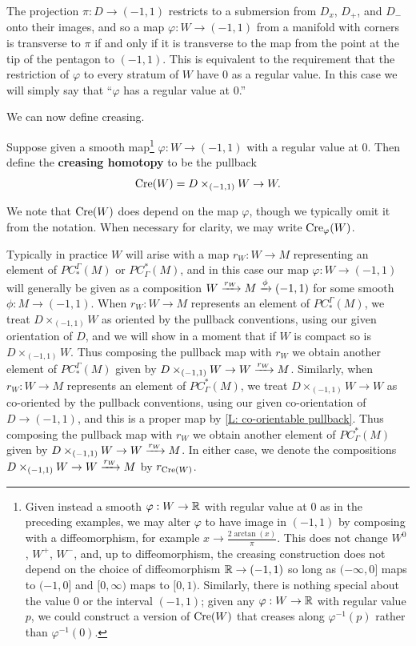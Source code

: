 The projection $\pi:D\to (-1,1)$ restricts to a submersion from $D_x$, $D_+$, and $D_-$ onto their images, and so a map $\varphi: W\to (-1,1)$ from a manifold with corners is transverse to $\pi$ if and only if it is transverse to the map from the point at the tip of the pentagon to $(-1,1)$. This is equivalent to the requirement that the restriction of $\varphi$ to every stratum of $W$ have $0$ as a regular value. In this case we will simply say that ``$\varphi$ has a regular value at $0$.''

We can now define creasing.

\begin{definition}
 Suppose given a smooth map\footnote{Given instead a smooth $\varphi:W\to \mathbb{R}$ with regular value at $0$ as in the preceding examples, we may alter $\varphi$ to have image in $(-1,1)$ by composing with a diffeomorphism, for example $x\to \frac{2\arctan(x)}{\pi}$. This does not change $W^0$, $W^+$, $W^-$, and, up to diffeomorphism, the creasing construction does not depend on the choice of diffeomorphism $\mathbb{R}\to (-1,1)$ so long as $(-\infty,0]$ maps to $(-1,0]$ and $[0,\infty)$ maps to $[0,1)$. Similarly, there is nothing special about the value $0$ or the interval $(-1,1)$; given any $\varphi:W\to \mathbb{R}$ with regular value $p$, we could construct a version of $\mathrm{Cre}(W)$ that creases along $\varphi^{-1}(p)$ rather than $\varphi^{-1}(0)$.
} $\varphi:W\to (-1,1)$  with a regular value at $0$. Then define the \textbf{creasing homotopy} to be the pullback
$$\mathrm{Cre}(W)=D\times_{(-1,1)} W\to W.$$

We note that
$\mathrm{Cre}(W)$ does depend on the map $\varphi$, though we typically omit it from the notation. When necessary for clarity, we may write $\mathrm{Cre}_\varphi(W)$.


Typically in practice $W$ will arise with a map $r_W:W\to M$ representing an element of $PC_*^\Gamma(M)$ or $PC^*_\Gamma(M)$, and in this case our map $\varphi: W\to (-1,1)$ will generally be given as a composition
 $W\xrightarrow{r_W}M\xrightarrow{\phi} (-1,1)$ for some smooth $\phi:M\to (-1,1)$. When $r_W:W\to M$ represents an element of  $PC_*^\Gamma(M)$, we treat $D\times_{(-1,1)} W$ as oriented by the pullback conventions, using our given orientation of $D$, and we will show in a moment that if $W$ is compact so is $D\times_{(-1,1)} W$. Thus composing the pullback map with $r_W$ we obtain another element of  $PC_*^\Gamma(M)$ given by  $D\times_{(-1,1)} W\to W\xrightarrow{r_W}M$. Similarly, when $r_W:W\to M$ represents an element of  $PC^*_\Gamma(M)$, we treat $D\times_{(-1,1)} W\to W$ as co-oriented by the pullback conventions, using our given co-orientation of $D\to (-1,1)$, and this is a proper map by \cref{L: co-orientable pullback}.
Thus composing the pullback map with $r_W$  we obtain another element of  $PC^*_\Gamma(M)$ given by  $D\times_{(-1,1)} W\to W\xrightarrow{r_W}M$. In either case, we denote the compositions $D\times_{(-1,1)} W\to W\xrightarrow{r_W}M$ by $r_{\mathrm{Cre}(W)}$.


\end{definition}
